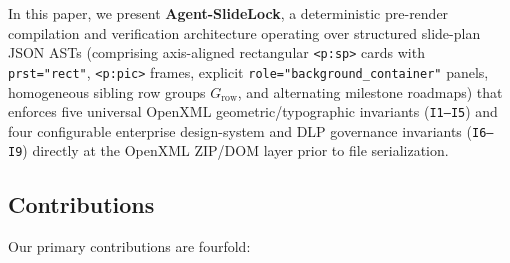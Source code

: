 \documentclass[10pt,journal,compsoc]{IEEEtran}
\begin{document}
In this paper, we present \textbf{Agent-SlideLock}, a deterministic pre-render compilation and verification architecture operating over structured slide-plan JSON ASTs (comprising axis-aligned rectangular \texttt{<p:sp>} cards with \texttt{prst="rect"}, \texttt{<p:pic>} frames, explicit \texttt{role="background\_container"} panels, homogeneous sibling row groups $G_{\text{row}}$, and alternating milestone roadmaps) that enforces five universal OpenXML geometric/typographic invariants (\texttt{I1--I5}) and four configurable enterprise design-system and DLP governance invariants (\texttt{I6--I9}) directly at the OpenXML ZIP/DOM layer prior to file serialization.

\subsection{Contributions}
Our primary contributions are fourfold:
\end{document}

